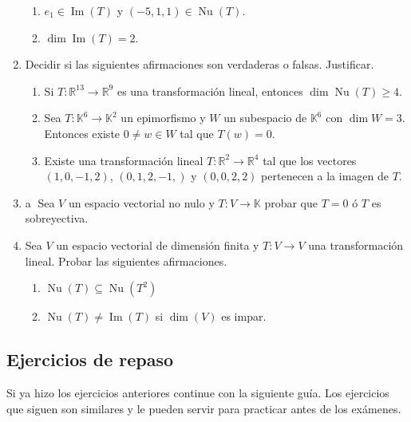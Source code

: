 \begin{enumerate}[topsep=6pt, itemsep=.4cm]
\begin{enumerate}[ topsep=5pt,itemsep=5pt]
    \item $e_1\in\operatorname{Im}(T)$ y $(-5,1,1)\in\operatorname{Nu}(T)$.
    
    \item $\operatorname{dim} \operatorname{Im}(T)=2$.
\end{enumerate}
    

\item Decidir si las siguientes afirmaciones son verdaderas o falsas. Justificar.
\begin{enumerate}
    \item  Si $T : \mathbb R^{13} \to \mathbb R^9$ es una transformación lineal, entonces $\dim \operatorname{Nu}(T) \geq  4$.
    \item Sea $T:\mathbb{K}^{6}\longrightarrow\mathbb{K}^2$ un epimorfismo y $W$ un subespacio de $\mathbb{K}^{6}$ con $\dim W=3$. Entonces existe $0\neq w\in W$ tal que $T(w)=0$.
    \item Existe una transformación lineal $T : \mathbb R^2 \to \mathbb R^4$ tal que los vectores $(1, 0, -1, 2)$, $(0, 1, 2,-1,)$ y $(0, 0, 2, 2)$ pertenecen a la imagen de $T$.
\end{enumerate}

\item \label{funcionales} \textcircled{a} Sea $V$ un espacio vectorial no nulo y $T:V\longrightarrow\mathbb{K}$ probar que $T=0$ ó $T$ es sobreyectiva.

\item Sea $V$ un espacio vectorial de dimensión finita y $T:V\longrightarrow V$ una transformación lineal. Probar las siguientes afirmaciones.
    \begin{multicols}{2}
        \begin{enumerate}
            \item $\operatorname{Nu}(T)\subseteq\operatorname{Nu}(T^2)$
            \item\label{dimV impar} $\operatorname{Nu}(T)\neq\operatorname{Im}(T)$ si $\dim(V)$ es impar.
        \end{enumerate}
    \end{multicols}



\end{enumerate}


\subsection*{Ejercicios de repaso}
Si ya hizo los ejercicios anteriores continue con la siguiente guía. Los ejercicios que siguen son similares y le pueden servir para practicar antes de los exámenes.

